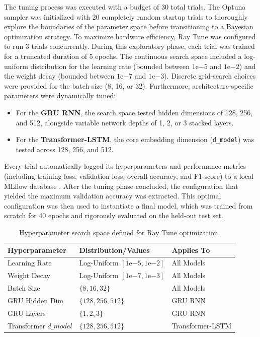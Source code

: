 The tuning process was executed with a budget of 30 total trials.
The Optuna sampler was initialized with 20 completely random startup trials to thoroughly explore the boundaries of the parameter space before
transitioning to a Bayesian optimization strategy. To maximize hardware efficiency, Ray Tune was configured to run 3 trials concurrently.
During this exploratory phase, each trial was trained for a truncated duration of 5 epochs.
The continuous search space included a log-uniform distribution for the learning rate (bounded between $1\mathrm{e}{-5}$ and $1\mathrm{e}{-2}$) and
the weight decay (bounded between $1\mathrm{e}{-7}$ and $1\mathrm{e}{-3}$). Discrete grid-search choices were provided for the batch size (8, 16, or 32).
Furthermore, architecture-specific parameters were dynamically tuned:
\begin{itemize}
    \item For the \textbf{GRU RNN}, the search space tested hidden dimensions of 128, 256, and 512, alongside variable network depths of 1, 2, or 3 stacked layers.
    \item For the \textbf{Transformer-LSTM}, the core embedding dimension (\texttt{d\_model}) was tested across 128, 256, and 512.
\end{itemize}
Every trial automatically logged its hyperparameters and performance metrics (including training loss, validation loss, overall accuracy, and F1-score)
to a local MLflow database \cite{zaharia2018accelerating}. After the tuning phase concluded, the configuration that yielded the maximum validation accuracy was extracted.
This optimal configuration was then used to instantiate a final model, which was trained from scratch for 40 epochs and rigorously evaluated on the held-out test set.

\begin{table}[htpb]
    \centering
    \renewcommand{\arraystretch}{1.2}
    \begin{tabular}{lll}
        \toprule
        \textbf{Hyperparameter} & \textbf{Distribution/Values} & \textbf{Applies To} \\
        \midrule
        Learning Rate & Log-Uniform $[1\mathrm{e}{-5}, 1\mathrm{e}{-2}]$ & All Models \\
        Weight Decay & Log-Uniform $[1\mathrm{e}{-7}, 1\mathrm{e}{-3}]$ & All Models \\
        Batch Size & $\{8, 16, 32\}$ & All Models \\
        GRU Hidden Dim & $\{128, 256, 512\}$ & GRU RNN \\
        GRU Layers & $\{1, 2, 3\}$ & GRU RNN \\
        Transformer $d\_model$ & $\{128, 256, 512\}$ & Transformer-LSTM \\
        \bottomrule
    \end{tabular}
    \caption{Hyperparameter search space defined for Ray Tune optimization.}
    \label{tab:search_space}
\end{table}